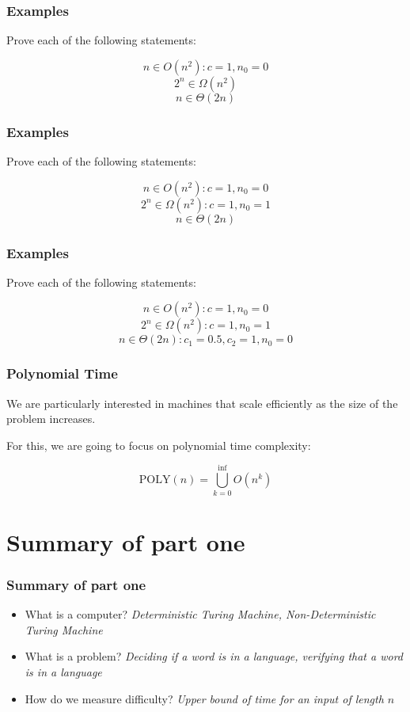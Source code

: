 \documentclass[aspectratio=169]{beamer}
\begin{document}
\begin{frame}
\frametitle{Examples}
Prove each of the following statements:

$$n \in O(n^2): c = 1, n_0 = 0$$
$$2^n \in \Omega(n^2)$$
$$n \in \Theta(2n)$$
\end{frame}

\begin{frame}
\frametitle{Examples}
Prove each of the following statements:

$$n \in O(n^2): c = 1, n_0 = 0$$
$$2^n \in \Omega(n^2): c = 1, n_0 = 1$$
$$n \in \Theta(2n)$$
\end{frame}

\begin{frame}
\frametitle{Examples}
Prove each of the following statements:

$$n \in O(n^2): c = 1, n_0 = 0$$
$$2^n \in \Omega(n^2): c = 1, n_0 = 1$$
$$n \in \Theta(2n): c_1 = 0.5, c_2 = 1, n_0 = 0$$
\end{frame}

\begin{frame}
\frametitle{Polynomial Time}

We are particularly interested in machines that scale efficiently as the size of the problem increases.

For this, we are going to focus on polynomial time complexity:

$$\mathrm{POLY}(n) = \bigcup_{k=0}^{\inf} O(n^k)$$
\end{frame}

\section{Summary of part one}

\begin{frame}
\frametitle{Summary of part one}
\begin{itemize}
    \item What is a computer? {\em Deterministic Turing Machine, Non-Deterministic Turing Machine}
    \item What is a problem? {\em Deciding if a word is in a language, verifying that a word is in a language}
    \item How do we measure difficulty? {\em Upper bound of time for an input of length $n$}
\end{itemize}
\end{frame}
\end{document}
